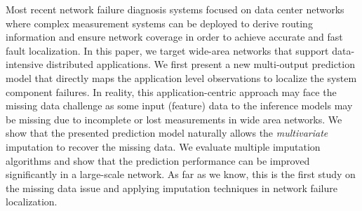 Most recent network failure diagnosis systems focused on data center networks where 
complex measurement systems can be deployed to derive routing information and ensure network coverage 
in order to achieve accurate and fast fault localization. In this paper, we target wide-area networks that 
support data-intensive distributed applications. We first present a new multi-output prediction model 
that directly maps the application level observations to localize the system component failures. 
In reality, this application-centric approach may face the missing data challenge as some input (feature) data 
to the inference models may be missing due to incomplete or lost measurements in wide area networks. 
We show that the presented prediction model naturally allows the {\it multivariate} imputation to recover the missing data. 
We evaluate multiple imputation algorithms and show that the prediction performance can be improved significantly in 
a large-scale network. As far as we know, this is the first study on the missing data issue and applying imputation techniques in network failure localization.
